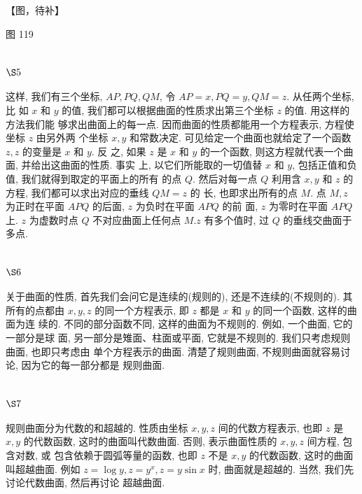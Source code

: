 【图，待补】

图 119

\section{$\S 5$}

这样, 我们有三个坐标, $A P, P Q, Q M$, 令 $A P=x, P Q=y, Q M=z$. 从任两个坐标, 比 如 $x$ 和 $y$ 的值, 我们都可以根据曲面的性质求出第三个坐标 $z$ 的值. 用这样的方法我们能 够求出曲面上的每一点. 因而曲面的性质都能用一个方程表示, 方程使坐标 $z$ 由另外两 个坐标 $x, y$ 和常数决定. 可见给定一个曲面也就给定了一个函数 $z, z$ 的变量是 $x$ 和 $y$. 反 之, 如果 $z$ 是 $x$ 和 $y$ 的一个函数, 则这方程就代表一个曲面, 并给出这曲面的性质. 事实 上, 以它们所能取的一切值替 $x$ 和 $y$, 包括正值和负值, 我们就得到取定的平面上的所有 的点 $Q$. 然后对每一点 $Q$ 利用含 $x, y$ 和 $z$ 的方程, 我们都可以求出对应的垂线 $Q M=z$ 的 长, 也即求出所有的点 $M$. 点 $M, z$ 为正时在平面 $A P Q$ 的后面, $z$ 为负时在平面 $A P Q$ 的前 面, $z$ 为零时在平面 $A P Q$ 上. $z$ 为虚数时点 $Q$ 不对应曲面上任何点 $M . z$ 有多个值时, 过 $Q$ 的垂线交曲面于多点.

\section{$\S 6$}

关于曲面的性质, 首先我们会问它是连续的(规则的), 还是不连续的(不规则的). 其 所有的点都由 $x, y, z$ 的同一个方程表示, 即 $z$ 都是 $x$ 和 $y$ 的同一个函数, 这样的曲面为连 续的. 不同的部分函数不同, 这样的曲面为不规则的. 例如, 一个曲面, 它的一部分是球 面, 另一部分是雉面、柱面或平面, 它就是不规则的. 我们只考虑规则曲面, 也即只考虑由 单个方程表示的曲面. 清楚了规则曲面, 不规则曲面就容易讨论, 因为它的每一部分都是 规则曲面.

\section{$\S 7$}

规则曲面分为代数的和超越的. 性质由坐标 $x, y, z$ 间的代数方程表示, 也即 $z$ 是 $x, y$ 的代数函数, 这时的曲面叫代数曲面. 否则, 表示曲面性质的 $x, y, z$ 间方程, 包含对数, 或 包含依赖于圆弧等量的函数, 也即 $z$ 不是 $x, y$ 的代数函数, 这时的曲面叫超越曲面. 例如 $z=\log y, z=y^{x}, z=y \sin x$ 时, 曲面就是超越的. 当然, 我们先讨论代数曲面, 然后再讨论 超越曲面.

